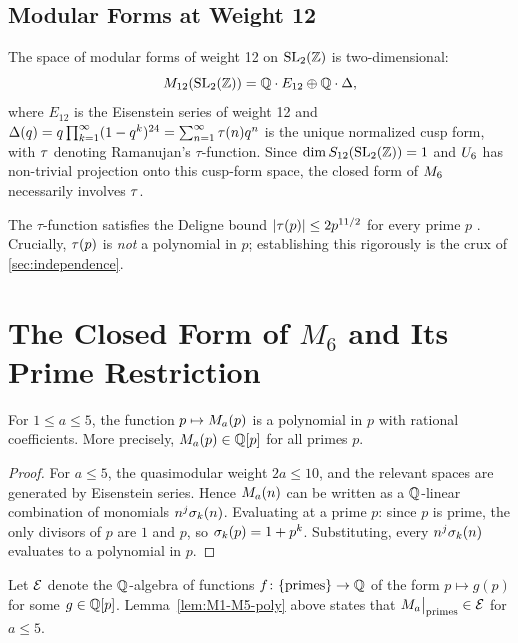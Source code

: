 \documentclass[11pt]{article}
\begin{document}
\subsection{Modular Forms at Weight 12}

The space of modular forms of weight 12 on $\operatorname{SL}_2(\mathbb{Z})$ is two-dimensional:
\[
  M_{12}(\operatorname{SL}_2(\mathbb{Z})) = \mathbb{Q}\cdot E_{12} \oplus \mathbb{Q}\cdot\Delta,
\]
where $E_{12}$ is the Eisenstein series of weight 12 and
$\Delta(q) = q\prod_{k=1}^{\infty}(1-q^k)^{24} = \sum_{n=1}^{\infty}\tau(n)q^n$
is the unique normalized cusp form, with $\tau$ denoting Ramanujan's $\tau$-function.
Since $\dim S_{12}(\operatorname{SL}_2(\mathbb{Z}))=1$ and $U_{6}$ has non-trivial projection onto this
cusp-form space, the closed form of $M_{6}$ necessarily involves $\tau$.

The $\tau$-function satisfies the Deligne bound $|\tau(p)|\le 2p^{11/2}$ for every prime
$p$ \cite{Deligne1974}.
Crucially, $\tau(p)$ is \emph{not} a polynomial in $p$; establishing this rigorously is
the crux of \cref{sec:independence}.

\section{The Closed Form of $M_6$ and Its Prime Restriction}
\label{sec:M6-prime}

\begin{lemma}
\label{lem:M1-M5-poly}
For $1\le a\le 5$, the function $p\mapsto M_{a}(p)$ is a polynomial in $p$ with rational
coefficients.
More precisely, $M_{a}(p)\in\mathbb{Q}[p]$ for all primes $p$.
\end{lemma}

\begin{proof}
For $a\le 5$, the quasimodular weight $2a\le 10$, and the relevant spaces are generated by
Eisenstein series.
Hence $M_{a}(n)$ can be written as a $\mathbb{Q}$-linear combination of monomials
$n^j\sigma_{k}(n)$.
Evaluating at a prime $p$: since $p$ is prime, the only divisors of $p$ are $1$ and $p$,
so $\sigma_{k}(p)=1+p^k$.
Substituting, every $n^j\sigma_{k}(n)$ evaluates to a polynomial in $p$.
\end{proof}

Let $\mathcal{E}$ denote the $\mathbb{Q}$-algebra of functions $f\colon\{\text{primes}\}\to\mathbb{Q}$ of the
form $p\mapsto g(p)$ for some $g\in\mathbb{Q}[p]$.
Lemma~\ref{lem:M1-M5-poly} above states that $M_{a}\big|_{\mathrm{primes}}\in\mathcal{E}$ for $a\le 5$.
\end{document}
